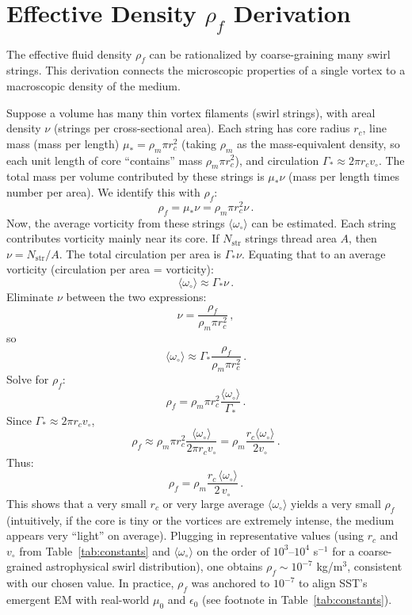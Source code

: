 \documentclass[reprint,aps,onecolumn,nofootinbib]{revtex4-2}
\begin{document}
	\section{Effective Density $\rho_f$ Derivation}
	The effective fluid density $\rho_f$ can be rationalized by coarse-graining many swirl strings. This derivation connects the microscopic properties of a single vortex to a macroscopic density of the medium.

	Suppose a volume has many thin vortex filaments (swirl strings), with areal density $\nu$ (strings per cross-sectional area). Each string has core radius $r_c$, line mass (mass per length) $\mu_* = \rho_m \pi r_c^2$ (taking $\rho_m$ as the mass-equivalent density, so each unit length of core “contains” mass $\rho_m \pi r_c^2$), and circulation $\Gamma_* \approx 2\pi r_c v_{\circ}$. The total mass per volume contributed by these strings is $\mu_*\nu$ (mass per length times number per area). We identify this with $\rho_f$:
	\[
		\rho_f = \mu_* \nu = \rho_m \pi r_c^2 \nu\,.
	\]
	Now, the average vorticity from these strings $\langle \omega_{\circ}\rangle$ can be estimated. Each string contributes vorticity mainly near its core. If $N_{\text{str}}$ strings thread area $A$, then $\nu = N_{\text{str}}/A$. The total circulation per area is $\Gamma_* \nu$. Equating that to an average vorticity (circulation per area = vorticity):
	\[
		\langle \omega_{\circ} \rangle \approx \Gamma_* \nu\,.
	\]
	Eliminate $\nu$ between the two expressions:
	\[
		\nu = \frac{\rho_f}{\rho_m \pi r_c^2}\,,
	\]
	so
	\[
		\langle \omega_{\circ} \rangle \approx \Gamma_* \frac{\rho_f}{\rho_m \pi r_c^2}\,.
	\]
	Solve for $\rho_f$:
	\[
		\rho_f = \rho_m \pi r_c^2 \frac{\langle \omega_{\circ}\rangle}{\Gamma_*}\,.
	\]
	Since $\Gamma_* \approx 2\pi r_c v_{\circ}$,
	\[
		\rho_f \approx \rho_m \pi r_c^2 \frac{\langle \omega_{\circ}\rangle}{2\pi r_c v_{\circ}} = \rho_m \frac{r_c \langle \omega_{\circ}\rangle}{2 v_{\circ}}\,.
	\]
	Thus:
	\[
		\rho_f = \rho_m \frac{r_c\,\langle \omega_{\circ}\rangle}{2\,v_{\circ}}\,.
	\]
	This shows that a very small $r_c$ or very large average $\langle \omega_{\circ}\rangle$ yields a very small $\rho_f$ (intuitively, if the core is tiny or the vortices are extremely intense, the medium appears very “light” on average). Plugging in representative values (using $r_c$ and $v_{\circ}$ from Table~\ref{tab:constants} and $\langle \omega_{\circ}\rangle$ on the order of $10^3$–$10^4$ s$^{-1}$ for a coarse-grained astrophysical swirl distribution), one obtains $\rho_f \sim 10^{-7}$ kg/m$^3$, consistent with our chosen value. In practice, $\rho_f$ was anchored to $10^{-7}$ to align SST’s emergent EM with real-world $\mu_0$ and $\epsilon_0$ (see footnote in Table~\ref{tab:constants}).
\end{document}
